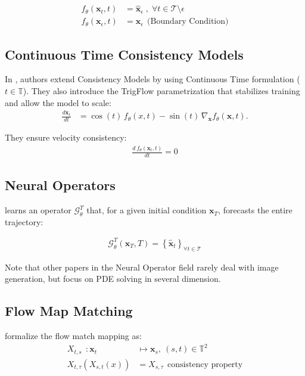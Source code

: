 \begin{align}
  f_{\theta}(\mathbf{x}_t, t) &= \widehat{\mathbf{x}}_{\epsilon} \;, \; \forall t \in \mathcal{T} \setminus \epsilon \\
  f_{\theta}(\mathbf{x}_{\epsilon}, t) &= \mathbf{x}_{\epsilon} \: \: \text{(Boundary Condition)}
\end{align}

\subsection{Continuous Time Consistency Models}
\noindent In \cite{lu2025simplifyingstabilizingscalingcontinuoustime}, authors extend Consistency Models by using Continuous Time formulation ($t \in \mathbb{T}$). They also introduce the TrigFlow parametrization that stabilizes training and allow the model to scale:
\begin{align}
    \frac{d\mathbf{x}_t}{dt} &= \cos(t)\, f_\theta(x, t) - \sin(t)\, \nabla_{\mathbf{x}} f_\theta(\mathbf{x}, t).
\end{align}

\noindent They ensure velocity consistency:
\begin{align}
    \frac{d\:f_{\theta}(\mathbf{x}_t, t)}{dt} = 0
\end{align}

\subsection{Neural Operators}
\noindent \cite{zheng2023fastsamplingdiffusionmodels} learns an operator $\mathcal{G}_{\theta}^{T}$ that, for a given initial condition $\mathbf{x}_T$, forecasts the entire trajectory:

\begin{align}
   \mathcal{G}_{\theta}^{T}(\mathbf{x}_T, T) = \left\{\widehat{\mathbf{x}}_t\right\}_{\forall t \in \mathcal{T}}
\end{align}

\noindent Note that other papers in the Neural Operator field \cite{ganeshram2025fcpinohighprecisionphysicsinformed} rarely deal with image generation, but focus on PDE solving in several dimension. 

\subsection{Flow Map Matching}
\noindent \cite{boffi2025flowmapmatchingstochastic} formalize the flow match mapping as:
\begin{align}
    X_{t, s} \: \: : \mathbf{x}_t & \mapsto \mathbf{x}_s, \: (s, t) \in \mathbb{T}^2 \\
    X_{t, \tau}(X_{s, t}(x)) & = X_{s, \tau} \: \: \text{consistency property}
\end{align}

